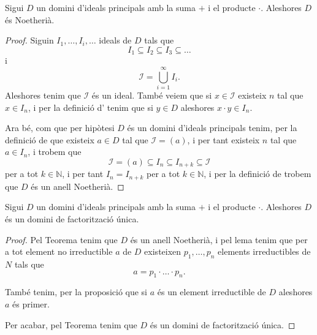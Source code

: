 \documentclass[../Apunts.tex]{subfiles}
\begin{document}
	\begin{theorem}
		\label{thm:DIP es Noetherià}
		Sigui \(D\) un domini d'ideals principals amb la suma \(+\) i el producte \(\cdot\). Aleshores \(D\) és Noetherià.
		\begin{proof}
			Siguin \(I_{1},\dots,I_{i},\dots\) ideals de \(D\) tals que
			\[I_{1}\subseteq I_{2}\subseteq I_{3}\subseteq\dots\]
			i
			\[\mathcal{I}=\bigcup_{i=1}^{\infty}I_{i}.\]
			Aleshores tenim que \(\mathcal{I}\) és un ideal. També veiem que si \(x\in\mathcal{I}\) existeix \(n\) tal que \(x\in I_{n}\), i per la definició d' tenim que si \(y\in D\) aleshores \(x\cdot y\in I_{n}\).
			
			Ara bé, com que per hipòtesi \(D\) és un domini d'ideals principals tenim, per la definició de  que existeix \(a\in D\) tal que \(\mathcal{I}=(a)\), i per tant existeix \(n\) tal que \(a\in I_{n}\), i trobem que
			\[\mathcal{I}=(a)\subseteq I_{n}\subseteq I_{n+k}\subseteq\mathcal{I}\]
			per a tot \(k\in\mathbb{N}\), i per tant \(I_{n}=I_{n+k}\) per a tot \(k\in\mathbb{N}\), i per la definició de  trobem que \(D\) és un anell Noetherià.
		\end{proof}
	\end{theorem}
	\begin{theorem}
		\label{thm:DIP és DFU}
		Sigui \(D\) un domini d'ideals principals amb la suma \(+\) i el producte \(\cdot\). Aleshores \(D\) és un domini de factorització única.
		\begin{proof}
			Pel Teorema  tenim que \(D\) és un anell Noetherià, i pel lema  tenim que per a tot element no irreductible \(a\) de \(D\) existeixen \(p_{1},\dots,p_{n}\) elements irreductibles de \(N\) tals que
			\[a=p_{1}\cdot\ldots\cdot p_{n}.\]
			
			També tenim, per la proposició  que si \(a\) és un element irreductible de \(D\) aleshores \(a\) és primer.
			
			Per acabar, pel Teorema  tenim que \(D\) és un domini de factorització única.
		\end{proof}
	\end{theorem}
\end{document}
